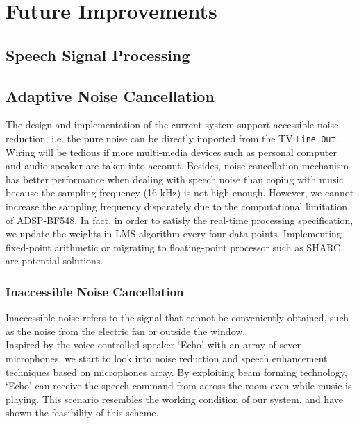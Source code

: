 
\section{Future Improvements}

\subsection{Speech Signal Processing}


\subsection{Adaptive Noise Cancellation}

The design and implementation of the current system support accessible noise reduction, i.e. the pure noise can be directly imported from the TV \texttt{Line Out}. Wiring will be tedious if more multi-media devices such as personal computer and audio speaker are taken into account. Besides, noise cancellation mechanism has better performance when dealing with speech noise than coping with music because the sampling frequency (16 kHz) is not high enough. However, we cannot increase the sampling frequency disparately due to the computational limitation of ADSP-BF548. In fact, in order to satisfy the real-time processing specification, we update the weights in LMS algorithm every four data points. Implementing fixed-point arithmetic or migrating to floating-point processor such as SHARC\textsuperscript{\textregistered} are potential solutions.


\subsubsection{Inaccessible Noise Cancellation}

Inaccessible noise refers to the signal that cannot be conveniently obtained, such as the noise from the electric fan or outside the window.\\

Inspired by the voice-controlled speaker `Echo' with an array of seven microphones, we start to look into noise reduction and speech enhancement techniques based on microphones array. By exploiting beam forming technology, `Echo' can receive the speech command from across the room even while music is playing. This scenario resembles the working condition of our system. \cite{mccowan2003microphone} and \cite{spalt2011background} have shown the feasibility of this scheme.

